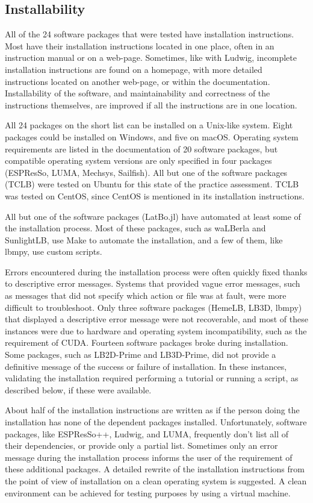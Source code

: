 \documentclass[final, 3p, times, authoryear]{elsarticle}
\begin{document}
\subsection{Installability}

All of the 24 software packages that were tested have installation instructions.
Most have their installation instructions located in one place, often in an
instruction manual or on a web-page. Sometimes, like with Ludwig, incomplete
installation instructions are found on a homepage, with more detailed
instructions located on another web-page, or within the documentation.
Installability of the software, and maintainability and correctness of the
instructions themselves, are improved if all the instructions are in one
location. 

All 24 packages on the short list can be installed on a Unix-like system. Eight
packages could be installed on Windows, and five on macOS. Operating system
requirements are listed in the documentation of 20 software packages, but
compatible operating system versions are only specified in four packages
(ESPResSo, LUMA, Mechsys, Sailfish). All but one of the software packages (TCLB)
were tested on Ubuntu for this state of the practice assessment. TCLB was tested
on CentOS, since CentOS is mentioned in its installation instructions.

All but one of the software packages (LatBo.jl) have automated at least some of
the installation process. Most of these packages, such as waLBerla and
SunlightLB, use Make to automate the installation, and a few of them, like
lbmpy, use custom scripts.

Errors encountered during the installation process were often quickly fixed
thanks to descriptive error messages. Systems that provided vague error
messages, such as messages that did not specify which action or file was at
fault, were more difficult to troubleshoot. Only three software packages
(HemeLB, LB3D, lbmpy) that displayed a descriptive error message were not
recoverable, and most of these instances were due to hardware and operating
system incompatibility, such as the requirement of CUDA. Fourteen software
packages broke during installation. Some packages, such as LB2D-Prime and
LB3D-Prime, did not provide a definitive message of the success or failure of
installation. In these instances, validating the installation required
performing a tutorial or running a script, as described below, if these were
available. 

About half of the installation instructions are written as if the person doing
the installation has none of the dependent packages installed. Unfortunately,
software packages, like ESPResSo++, Ludwig, and LUMA, frequently don't list all
of their dependencies, or provide only a partial list. Sometimes only an error
message during the installation process informs the user of the requirement of
these additional packages. A detailed rewrite of the installation instructions
from the point of view of installation on a clean operating system is suggested.
A clean environment can be achieved for testing purposes by using a virtual
machine.
\end{document}
